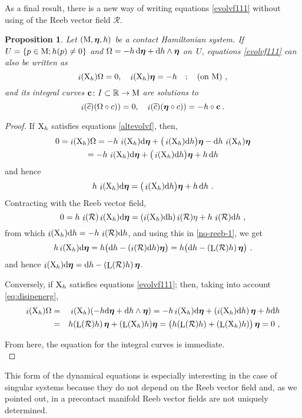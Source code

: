 \documentclass[12pt]{report}
\newtheorem{prop}[teor]{Proposition}
\def\beq{\begin{equation}}
\def\eeq{\end{equation}}
\def\beann{\begin{eqnarray*}}
\def\eeann{\end{eqnarray*}}
\def\qed{\ifvmode\removelastskip\fi
{\unskip\nobreak\hfil\penalty50\hbox{}\nobreak\hfil
\hbox{\vrule height1.2ex width1.2ex}\parfillskip=0pt
\finalhyphendemerits=0 \par\smallskip}}
\def\d{{\rm d}}
\def\h{{\rm h}}
\def\Real{\mathbb{R}}
\def\bmeta{\mbox{\boldmath $\eta$}}
\def\X{{\rm X}}
\def\Lie{\mathop{\rm L}\nolimits}
\def\inn{\mathop{i}\nolimits}
\newcommand{\Reeb}{\mathcal{R}}
\begin{document}
As a final result, there is a new way of writing equations \eqref{evolvf111} 
without using of the Reeb vector field $\Reeb$. 

\begin{prop}
Let $({\rm M},\bmeta,h)$ be a contact Hamiltonian system.
If $U=\{p\in {\rm M};h(p)\not= 0\}$ and $\Omega = -h\,\d\bmeta+\d h\wedge\bmeta$ on~$U$,
equations \eqref{evolvf111} can also be written as
\beq
\label{altevolvf}
\inn(\X_h)\Omega=0 ,\quad\inn(\X_h)\bmeta=-h\quad ;
\quad \mbox{\rm (on ${\rm M}$)} \ , 
\eeq
and its integral curves ${\bf c}\colon I\subset\Real\to {\rm M}$ are solutions to
$$
\inn(\widetilde c)(\Omega\circ c)) = 0 ,\quad\inn(\widetilde c)(\bmeta\circ c)) = - h\circ{\bf c} \:. 
$$
\end{prop}
\begin{proof}
If $\X_h$ satisfies equations \eqref{altevolvf}, then,
\begin{multline*}
0=\inn(\X_h)\Omega=-h\,\inn(\X_h)\d\bmeta+\big(\inn(\X_h)\d h\big)\bmeta-\d h\,\inn(\X_h)\bmeta\\
= -h\,\inn(\X_h)\d\bmeta+\big(\inn(\X_h)\d h\big)\bmeta+h\,\d h
\end{multline*}
and hence
\beq
\label{no-reeb-1}
h\,\inn(\X_h)\d\bmeta=\big(\inn(\X_h)\d h\big)\bmeta+h\,\d h \ .
\eeq
Contracting with the Reeb vector field,
\begin{equation*}
0=h\,\inn(\Reeb)\inn(\X_h)\d\bmeta =
(\inn(\X_h)\d\h)\inn(\Reeb)\eta+h\,\inn(\Reeb)\d h\ ,
\end{equation*}
from which $\inn(\X_h)\d h=-h\,\inn(\Reeb)\d h$,
and using this in \eqref{no-reeb-1}, we get
\begin{equation*}
h\inn(\X_h)\d\bmeta=
h\big(\d h-(\inn(\Reeb)\d h)\bmeta\big)=
h\big(\d h-(\Lie(\Reeb)h)\,\bmeta\big)\ .
\end{equation*}
and hence $\inn(\X_h)\d\bmeta=\d h-(\Lie(\Reeb)h)\,\bmeta$.
    
Conversely, if $\X_h$ satisfies equations  \eqref{evolvf111}; then, taking into account \eqref{eq:disipenerg},
\beann
\inn(\X_h)\Omega&=&\inn(\X_h)(-h\d\bmeta+\d h\wedge\bmeta)=
-h\inn(\X_h)\d\bmeta+(\inn(\X_h)\d h)\,\bmeta+h\d h
\\ &=& 
h(\Lie(\Reeb)h)\,\bmeta+(\Lie(\X_h)h)\bmeta=
\big(h(\Lie(\Reeb)h)+(\Lie(\X_h)h)\big)\,\bmeta=0 \ ,
\eeann 

From here, the equation for the integral curves is immediate.
\\ \qed\end{proof}

This form of the dynamical equations is especially interesting in the case of singular systems because they do not depend on the Reeb vector field and, as we pointed out, 
in a precontact manifold Reeb vector fields are not uniquely determined.
\end{document}
